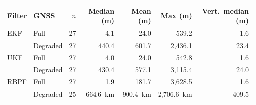 \begin{tabular}{llrrrrr}
\toprule
Filter & GNSS & \(n\) & Median (m) & Mean (m) & Max (m) & Vert.\ median (m) \\
\midrule
EKF & Full & 27 & 4.1 & 24.0 & 539.2 & 1.6 \\
 & Degraded & 27 & 440.4 & 601.7 & 2{,}436.1 & 23.4 \\
\midrule
UKF & Full & 27 & 4.0 & 24.0 & 542.8 & 1.6 \\
 & Degraded & 27 & 430.4 & 577.1 & 3{,}115.4 & 24.0 \\
\midrule
RBPF & Full & 27 & 1.9 & 181.7 & 3{,}628.5 & 1.6 \\
 & Degraded & 25 & 664.6~km & 900.4~km & 2{,}706.6~km & 409.5 \\
\bottomrule
\end{tabular}
